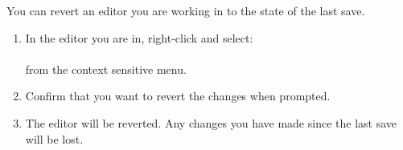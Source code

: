 You can revert an editor you are working in to the state of the last save.
\begin{enumerate}
\item In the editor you are in, right-click and select:\\
\\
from the context sensitive menu. 
\item Confirm that you want to revert the changes when prompted. 
\item The editor will be reverted. Any changes you have made since the last save will be lost. 
\end{enumerate}
